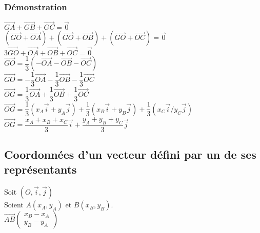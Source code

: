 \subsubsection{Démonstration}

$ \overrightarrow{GA} + \overrightarrow{GB} + \overrightarrow{GC} = \overrightarrow{0} $\\

$\left( \overrightarrow{GO} + \overrightarrow{OA} \right) + \left(\overrightarrow{GO} + \overrightarrow{OB}\right) + \left(\overrightarrow{GO} + \overrightarrow{OC} \right) = \overrightarrow{0} $\\

$ 3\overrightarrow{GO} + \overrightarrow{OA} + \overrightarrow{OB} + \overrightarrow{OC} = \overrightarrow{0} $\\

$ \overrightarrow{GO} = \dfrac{1}{3} \left(-\overrightarrow{OA} -\overrightarrow{OB} - \overrightarrow{OC} \right) $\\

$ \overrightarrow{GO} = -\dfrac{1}{3} \overrightarrow{OA} -\dfrac{1}{3} \overrightarrow{OB} - \dfrac{1}{3} \overrightarrow{OC} $\\

$ \overrightarrow{OG} = \dfrac{1}{3} \overrightarrow{OA} +\dfrac{1}{3} \overrightarrow{OB} + \dfrac{1}{3} \overrightarrow{OC} $\\

$ \overrightarrow{OG} = \dfrac{1}{3} \left(x_A\vec{i} + y_A\vec{j} \right) +\dfrac{1}{3} \left(x_B\vec{i} + y_B\vec{j} \right) + \dfrac{1}{3} \left(x_C\vec{i} / y_C\vec{j} \right) $\\

$ \overrightarrow{OG} = \dfrac{x_A + x_B + x_C}{3}\vec{i} + \dfrac{y_A + y_B + y_C}{3} \vec{j} $\\

\newpage

\subsection{Coordonnées d'un vecteur défini par un de ses représentants}

Soit $\left( O, \vec{i}, \vec{j}\right)$\\

Soient  $A\left(x_A, y_A\right)$ et $B\left(x_B, y_B\right) $.\\

$\overrightarrow{AB} \left(\begin{array}{c} x_B - x_A\\ y_B - y_A \end{array}\right)$\\


